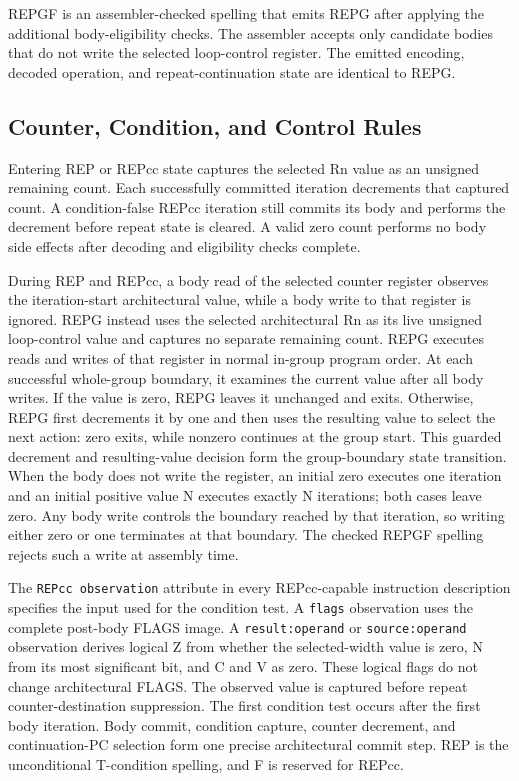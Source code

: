 REPGF is an assembler-checked spelling that emits REPG after applying the additional body-eligibility checks. The
assembler accepts only candidate bodies that do not write the selected loop-control register. The emitted encoding,
decoded operation, and repeat-continuation state are identical to REPG.

\subsection{Counter, Condition, and Control Rules}

Entering REP or REPcc state captures the selected Rn value as an unsigned remaining count. Each successfully
committed iteration decrements that captured count. A condition-false REPcc iteration still commits its body and
performs the decrement before repeat state is cleared. A valid zero count performs no body side effects after
decoding and eligibility checks complete.

During REP and REPcc, a body read of the selected counter register observes the iteration-start architectural value,
while a body write to that register is ignored. REPG instead uses the selected architectural Rn as its live unsigned
loop-control value and captures no separate remaining count. REPG executes reads and writes of that register in
normal in-group program order. At each successful whole-group boundary, it examines the current value after all body
writes. If the value is zero, REPG leaves it unchanged and exits. Otherwise, REPG first decrements it by one and then
uses the resulting value to select the next action: zero exits, while nonzero continues at the group start. This
guarded decrement and resulting-value decision form the group-boundary state transition. When the body does not
write the register, an initial zero executes one iteration and an initial positive value N executes exactly N
iterations; both cases leave zero. Any body write controls the boundary reached by that iteration, so writing either
zero or one terminates at that boundary. The checked REPGF spelling rejects such a write at assembly time.

The \texttt{REPcc observation} attribute in every REPcc-capable instruction description specifies the input used for
the condition test. A \texttt{flags} observation uses the complete post-body FLAGS image. A \texttt{result:operand} or
\texttt{source:operand} observation derives logical Z from whether the selected-width value is zero, N from its most
significant bit, and C and V as zero. These logical flags do not change architectural FLAGS. The observed value is
captured before repeat counter-destination suppression. The first condition test occurs after the first body
iteration. Body commit, condition capture, counter decrement, and continuation-PC selection form one precise
architectural commit step. REP is the unconditional T-condition spelling, and F is reserved for REPcc.

